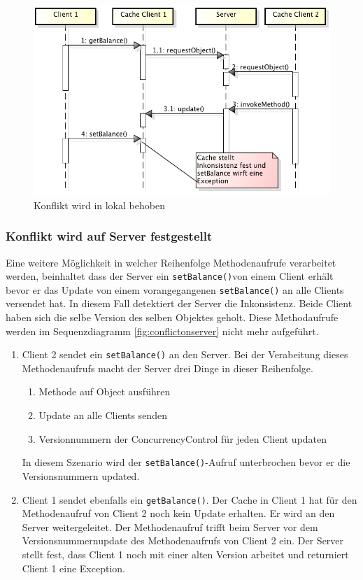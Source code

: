 \begin{figure}[h]
  \centering
\includegraphics[scale=0.3]{images_objectcaching/conflictInCache}  
  \caption{Konflikt wird in lokal behoben}
  \label{fig:localconflict}
\end{figure}

\subsubsection{Konflikt wird auf Server festgestellt}
\label{sec:konflikt-wird-auf-1}

Eine weitere Möglichkeit in welcher Reihenfolge Methodenaufrufe verarbeitet werden, beinhaltet dass der Server ein \verb|setBalance()|von einem Client erhält bevor er das Update von einem vorangegangenen \texttt{setBalance()} an alle Clients versendet hat. In diesem Fall detektiert der Server die Inkonsistenz. Beide Client haben sich die selbe Version des selben Objektes geholt. Diese Methodaufrufe werden im Sequenzdiagramm \ref{fig:conflictonserver} nicht mehr aufgeführt.

\begin{enumerate}
\item Client 2 sendet ein \verb|setBalance()| an den Server. Bei der Verabeitung dieses Methodenaufrufs macht der Server drei Dinge in dieser Reihenfolge.
  \begin{enumerate}
  \item Methode auf Object ausführen
  \item Update an alle Clients senden
  \item Versionnummern der ConcurrencyControl für jeden Client updat\-en
\end{enumerate}
In diesem Szenario wird der \texttt{setBalance()}-Aufruf unterbrochen bevor er die Versionsnummern updated.
\item Client 1 sendet ebenfalls ein \verb|getBalance()|. Der Cache in Client 1 hat für den Methodenaufruf von Client 2 noch kein Update erhalten. Er wird an den Server weitergeleitet. Der Methodenaufruf trifft beim Server vor dem Versionsnummernupdate des Methodenaufrufs von Client 2 ein. Der Server stellt fest, dass Client 1 noch mit einer alten Version arbeitet und returniert Client 1 eine Exception.
\end{enumerate}

